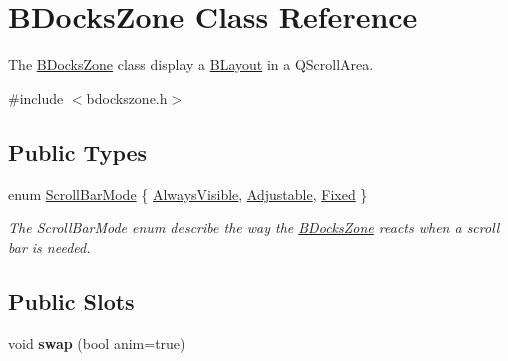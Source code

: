\hypertarget{class_b_docks_zone}{\section{\-B\-Docks\-Zone \-Class \-Reference}
\label{class_b_docks_zone}
}


\-The \hyperlink{class_b_docks_zone}{\-B\-Docks\-Zone} class display a \hyperlink{class_b_layout}{\-B\-Layout} in a \-Q\-Scroll\-Area.  




{\ttfamily \#include $<$bdockszone.\-h$>$}

\subsection*{\-Public \-Types}
\begin{DoxyCompactItemize}
\item 
enum \hyperlink{class_b_docks_zone_aaa04c632b39dce77b61a3a28b7418fdd}{\-Scroll\-Bar\-Mode} \{ \hyperlink{class_b_docks_zone_aaa04c632b39dce77b61a3a28b7418fdda56cc1afb42c3bd98e3e64599883383a5}{\-Always\-Visible}, 
\hyperlink{class_b_docks_zone_aaa04c632b39dce77b61a3a28b7418fdda4907ef1b3e3b8174073ec707a9753105}{\-Adjustable}, 
\hyperlink{class_b_docks_zone_aaa04c632b39dce77b61a3a28b7418fddae1dd9bb823904efc8224bffef1fe6f22}{\-Fixed}
 \}
\begin{DoxyCompactList}\small\item\em \-The \-Scroll\-Bar\-Mode enum describe the way the \hyperlink{class_b_docks_zone}{\-B\-Docks\-Zone} reacts when a scroll bar is needed. \end{DoxyCompactList}\end{DoxyCompactItemize}
\subsection*{\-Public \-Slots}
\begin{DoxyCompactItemize}
\item 
\hypertarget{class_b_docks_zone_a41a7757fb2b8b4cc5c27f9d5a0e3a841}{void {\bfseries swap} (bool anim=true)}\label{class_b_docks_zone_a41a7757fb2b8b4cc5c27f9d5a0e3a841}

\end{DoxyCompactItemize}
